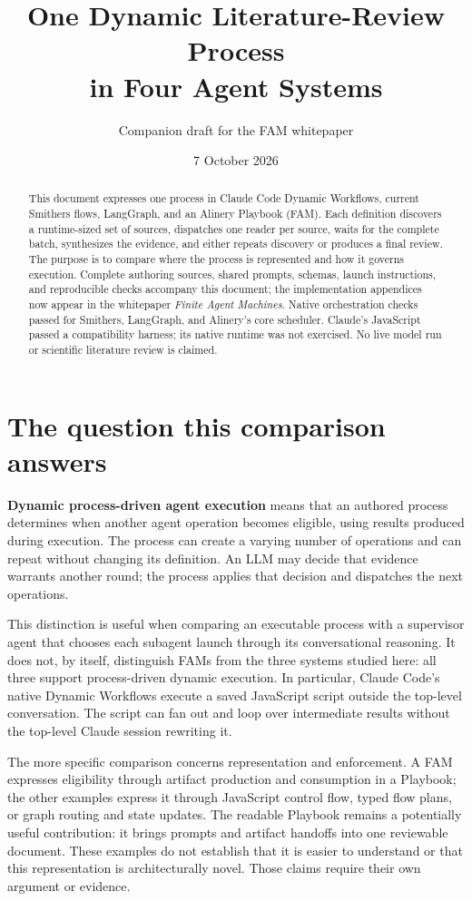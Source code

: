 \documentclass[11pt,letterpaper]{article}
\title{One Dynamic Literature-Review Process\\in Four Agent Systems}
\author{Companion draft for the FAM whitepaper}
\date{7 October 2026}
\begin{document}
\maketitle
\begin{abstract}
This document expresses one process in Claude Code Dynamic Workflows, current Smithers flows, LangGraph, and an Alinery Playbook (FAM). Each definition discovers a runtime-sized set of sources, dispatches one reader per source, waits for the complete batch, synthesizes the evidence, and either repeats discovery or produces a final review. The purpose is to compare where the process is represented and how it governs execution. Complete authoring sources, shared prompts, schemas, launch instructions, and reproducible checks accompany this document; the implementation appendices now appear in the whitepaper \emph{Finite Agent Machines}. Native orchestration checks passed for Smithers, LangGraph, and Alinery's core scheduler. Claude's JavaScript passed a compatibility harness; its native runtime was not exercised. No live model run or scientific literature review is claimed.
\end{abstract}

\tableofcontents
\clearpage
\section{The question this comparison answers}
\textbf{Dynamic process-driven agent execution} means that an authored process determines when another agent operation becomes eligible, using results produced during execution. The process can create a varying number of operations and can repeat without changing its definition. An LLM may decide that evidence warrants another round; the process applies that decision and dispatches the next operations.

This distinction is useful when comparing an executable process with a supervisor agent that chooses each subagent launch through its conversational reasoning. It does not, by itself, distinguish FAMs from the three systems studied here: all three support process-driven dynamic execution. In particular, Claude Code's native Dynamic Workflows execute a saved JavaScript script outside the top-level conversation. The script can fan out and loop over intermediate results without the top-level Claude session rewriting it.\cite{claude-workflows}

The more specific comparison concerns representation and enforcement. A FAM expresses eligibility through artifact production and consumption in a Playbook; the other examples express it through JavaScript control flow, typed flow plans, or graph routing and state updates. The readable Playbook remains a potentially useful contribution: it brings prompts and artifact handoffs into one reviewable document. These examples do not establish that it is easier to understand or that this representation is architecturally novel. Those claims require their own argument or evidence.
\end{document}
